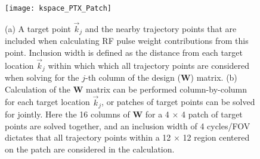 
\begin{figure}
	\centering
	\texttt{[image: kspace\_PTX\_Patch]}
	\caption{(a) A target point $\vec{k}_j$ and the nearby trajectory points that are included when calculating 
	RF pulse weight contributions from this point.
	Inclusion width is defined as the distance from each target location $\vec{k}_j$ within which 
	which all trajectory points are considered when solving for the $j$-th column of the design ($\bm{W}$) matrix.
	(b) Calculation of the $\bm{W}$ matrix can be performed column-by-column for each target location $\vec{k}_j$,
	or patches of target points can be solved for jointly. 
	Here the 16 columns of $\bm{W}$ for a 4 $\times$ 4 patch of target points are solved together,
	and an inclusion width of 4 cycles/FOV dictates that all trajectory points within a 12 $\times$ 12 region
	centered on the patch are considered in the calculation.}
	\label{fig:Patch}
\end{figure}

